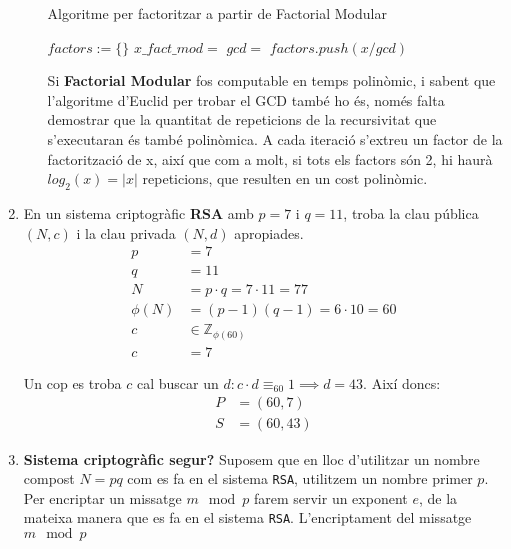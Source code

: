 \documentclass[a4paper]{article}
\begin{document}
\begin{enumerate}
\begin{enumerate}
	\begin{algorithm}[H]
		\caption{Algoritme per factoritzar a partir de Factorial Modular}
		\begin{algorithmic}[1]	
			\State $factors := \{\}$	
			\State $x\_fact\_mod = $ 
			\State $gcd = $ 
			\State $factors.push (x / gcd)$
			\State {}
			\EndIf
			\State \Return
			\EndFunction		
		\end{algorithmic}
	\end{algorithm}
	
	Si \textbf{Factorial Modular} fos computable en temps polinòmic, i sabent que l'algoritme d'Euclid per trobar el GCD també ho és, només falta demostrar que la quantitat de repeticions de la recursivitat que s'executaran és també polinòmica. A cada iteració s'extreu un factor de la factorització de x, així que com a molt, si tots els factors són 2, hi haurà $log_2(x) = |x|$ repeticions, que resulten en un cost polinòmic.
	
\end{enumerate} 

\item En un sistema criptogràfic \textbf{RSA} amb $p = 7$ i $q = 11$, troba la clau pública $(N, c)$ i la clau privada $(N, d)$ apropiades.
\begin{align*}
	p &= 7 \\
	q &= 11 \\
	N &= p \cdot q = 7 \cdot 11 = 77 \\
	\phi(N) &= (p - 1)(q - 1) = 6 \cdot 10 = 60 \\
	c &\in \mathbb{Z}_{\phi(60)} \\
	c &= 7
\end{align*}

Un cop es troba $c$ cal buscar un $d : c \cdot d \equiv_{60} 1 \implies d = 43$. Així doncs:
\begin{align*}
	P &= (60, 7) \\
	S &= (60, 43)
\end{align*}

\item \textbf{Sistema criptogràfic segur?} Suposem que en lloc d'utilitzar un nombre compost $N = pq$ com es fa en el sistema \texttt{RSA}, utilitzem un nombre primer $p$. Per encriptar un missatge $m \mod p$ farem servir un exponent $e$, de la mateixa manera que es fa en el sistema \texttt{RSA}. L'encriptament del missatge $m \mod p$ 

\end{enumerate}
\end{document}
